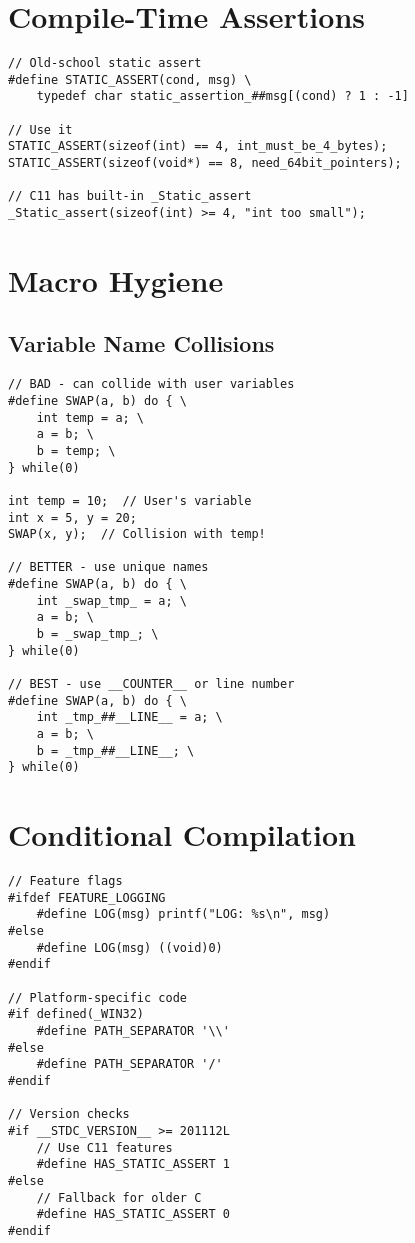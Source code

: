 \section{Compile-Time Assertions}

\begin{lstlisting}
// Old-school static assert
#define STATIC_ASSERT(cond, msg) \
    typedef char static_assertion_##msg[(cond) ? 1 : -1]

// Use it
STATIC_ASSERT(sizeof(int) == 4, int_must_be_4_bytes);
STATIC_ASSERT(sizeof(void*) == 8, need_64bit_pointers);

// C11 has built-in _Static_assert
_Static_assert(sizeof(int) >= 4, "int too small");
\end{lstlisting}

\section{Macro Hygiene}

\subsection{Variable Name Collisions}

\begin{lstlisting}
// BAD - can collide with user variables
#define SWAP(a, b) do { \
    int temp = a; \
    a = b; \
    b = temp; \
} while(0)

int temp = 10;  // User's variable
int x = 5, y = 20;
SWAP(x, y);  // Collision with temp!

// BETTER - use unique names
#define SWAP(a, b) do { \
    int _swap_tmp_ = a; \
    a = b; \
    b = _swap_tmp_; \
} while(0)

// BEST - use __COUNTER__ or line number
#define SWAP(a, b) do { \
    int _tmp_##__LINE__ = a; \
    a = b; \
    b = _tmp_##__LINE__; \
} while(0)
\end{lstlisting}

\section{Conditional Compilation}

\begin{lstlisting}
// Feature flags
#ifdef FEATURE_LOGGING
    #define LOG(msg) printf("LOG: %s\n", msg)
#else
    #define LOG(msg) ((void)0)
#endif

// Platform-specific code
#if defined(_WIN32)
    #define PATH_SEPARATOR '\\'
#else
    #define PATH_SEPARATOR '/'
#endif

// Version checks
#if __STDC_VERSION__ >= 201112L
    // Use C11 features
    #define HAS_STATIC_ASSERT 1
#else
    // Fallback for older C
    #define HAS_STATIC_ASSERT 0
#endif
\end{lstlisting}

